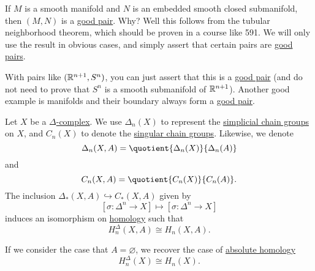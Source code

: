 \begin{remark}
	If $M$ is a smooth manifold and $N$ is an embedded smooth closed submanifold, then $(M, N)$ is a \hyperref[def:good-pair]{good pair}. Why? Well this
	follows from the tubular neighborhood theorem, which should be proven in a course like 591. We will only use the result in obvious cases, and simply
	assert that certain pairs are \hyperref[def:good-pair]{good pairs}.
\end{remark}

With pairs like $(\mathbb{\MakeUppercase{r}}^{n + 1}, S^n)$, you can just assert that this is a \hyperref[def:good-pair]{good pair} (and do not need to
prove that $S^n$ is a smooth submanifold of $\mathbb{\MakeUppercase{r}}^{n + 1}$). Another good example is manifolds and their boundary always form a \hyperref[def:good-pair]{good pair}.

\begin{theorem}\label{thm:singular-homology-agrees-with-simplicial-homology}
	Let $X$ be a \hyperref[def:delta-complex]{$\Delta$-complex}. We use $\Delta_n(X)$ to represent the \hyperref[def:simplicial-complex]{simplicial chain groups} on $X$, and
	$C_n(X)$ to denote the \hyperref[def:singular-chain]{singular chain groups}. Likewise, we denote
	\[
		\Delta_n(X, A) = \quotient{\Delta_n(X)}{\Delta_n(A)}
	\]
	and
	\[
		C_n(X, A) = \quotient{C_n(X)}{C_n(A)}.
	\]
	The inclusion $\Delta_\ast(X, A) \hookrightarrow C_\ast(X, A)$ given by
	\[
		[\sigma : \Delta^n \to X] \mapsto [\sigma : \Delta^n \to X]
	\]
	induces an isomorphism on \hyperref[def:homology-group]{homology} such that
	\[
		H_n^\Delta(X, A) \cong H_n(X, A).
	\]

	If we consider the case that \(A = \varnothing\), we recover the case of \hyperref[def:homology-group]{absolute homology}
	\[
		H_n^\Delta(X) \cong H_n(X).
	\]
\end{theorem}

